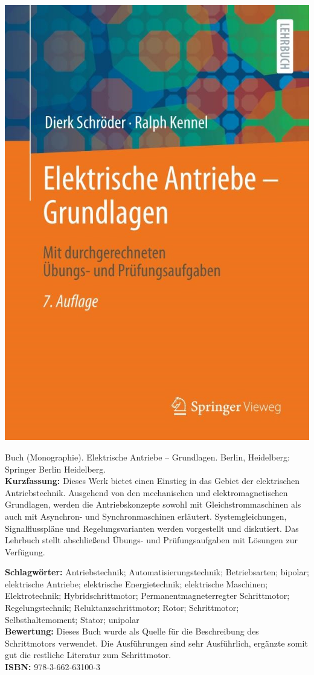 {
\begin{minipage}{0.38\textwidth}
	\includegraphics[width=\linewidth]{images/Schroeder.jpg}
\end{minipage}
\hfill
\begin{minipage}{0.6\textwidth}
Buch (Monographie). Elektrische Antriebe – Grundlagen. Berlin, Heidelberg: Springer Berlin Heidelberg.	
\\ \textbf{Kurzfassung:}
Dieses Werk bietet einen Einstieg in das Gebiet der elektrischen Antriebstechnik. Ausgehend von den mechanischen und elektromagnetischen Grundlagen, werden die Antriebskonzepte sowohl mit Gleichstrommaschinen als auch mit Asynchron- und Synchronmaschinen erläutert. Systemgleichungen, Signalflusspläne und Regelungsvarianten werden vorgestellt und diskutiert. Das Lehrbuch stellt abschließend Übungs- und Prüfungsaufgaben mit Lösungen zur Verfügung.
\end{minipage}
\textbf{Schlagwörter:}
Antriebstechnik; Automatisierungstechnik; Betriebsarten; bipolar; elektrische Antriebe; elektrische Energietechnik; elektrische Maschinen; Elektrotechnik; Hybridschrittmotor; Permanentmagneterregter Schrittmotor; Regelungstechnik; Reluktanzschrittmotor; Rotor; Schrittmotor; Selbsthaltemoment; Stator; unipolar
\\ \textbf{Bewertung:}
Dieses Buch wurde als Quelle für die Beschreibung des Schrittmotors verwendet. Die Ausführungen sind sehr Ausführlich, ergänzte somit gut die restliche Literatur zum Schrittmotor.
\\ \textbf{ISBN:}
978-3-662-63100-3
}


